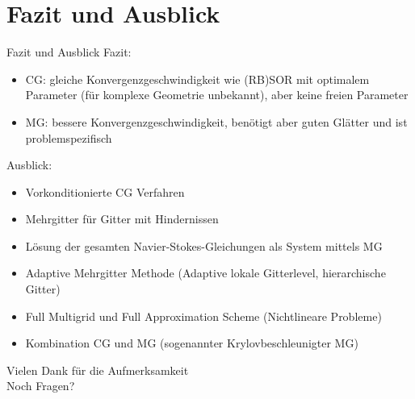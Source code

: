 \documentclass[aspectratio=169]{beamer}
\theoremstyle{thm}
\begin{document}
\section{Fazit und Ausblick}\label{sec:Fazit}
\begin{frame}{Fazit und Ausblick}
  Fazit:
  \begin{itemize}[<+(1)->]
    \item CG: gleiche Konvergenzgeschwindigkeit wie (RB)SOR mit optimalem
        Parameter (für komplexe Geometrie unbekannt), aber keine freien Parameter
    \item MG: bessere Konvergenzgeschwindigkeit, benötigt aber guten Glätter
        und ist problemspezifisch
  \end{itemize}
  \pause
  Ausblick:
  \begin{itemize}[<+(1)->]
    \item Vorkonditionierte CG Verfahren
    \item Mehrgitter für Gitter mit Hindernissen
    \item Lösung der gesamten Navier-Stokes-Gleichungen als System mittels MG
    \item Adaptive Mehrgitter Methode (Adaptive lokale Gitterlevel,
        hierarchische Gitter)
    \item Full Multigrid und Full Approximation Scheme (Nichtlineare Probleme)
    \item Kombination CG und MG (sogenannter Krylovbeschleunigter MG)
  \end{itemize}
\end{frame}

\begin{frame}[plain]
  \begin{center}
    \Large \textcolor{simtechred}{ Vielen Dank für die Aufmerksamkeit } \\[2em]
    \normalsize Noch Fragen?
  \end{center}
\end{frame}
\end{document}
